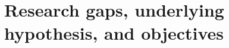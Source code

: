 \chapter{Research gaps, underlying hypothesis, and objectives} \label{Hyp}
{\textcolor{red}{ \lipsum[1-2]}}
